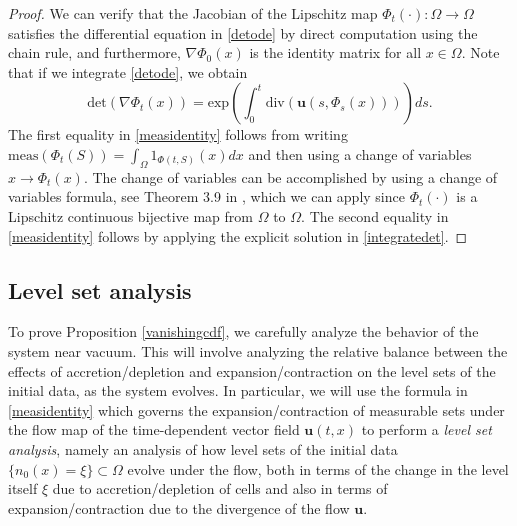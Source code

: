 \documentclass[12pt]{article}
\newcommand{\bd}{\boldsymbol}
\theoremstyle{plain}
\begin{document}
\begin{proof}
We can verify that the Jacobian of the Lipschitz map $\Phi_{t}(\cdot): \Omega \to \Omega$ satisfies the differential equation in \eqref{detode} by direct computation using the chain rule, and furthermore, $\nabla \Phi_{0}(x)$ is the identity matrix for all $x \in \Omega$. Note that if we integrate \eqref{detode}, we obtain
\begin{equation}\label{integratedet}
\text{det}(\nabla \Phi_{t}(x)) = \text{exp}\left(\int_{0}^{t} \text{div}(\bd{u}(s, \Phi_{s}(x)))\right) ds.
\end{equation}
The first equality in \eqref{measidentity} follows from writing $\displaystyle \text{meas}(\Phi_{t}(S)) = \int_{\Omega} 1_{\Phi(t, S)}(x) dx$ and then using a change of variables $x \to \Phi_{t}(x)$. The change of variables can be accomplished by using a change of variables formula, see Theorem 3.9 in \cite{EvansGariepy}, which we can apply since $\Phi_{t}(\cdot)$ is a Lipschitz continuous bijective map from $\Omega$ to $\Omega$. The second equality in \eqref{measidentity} follows by applying the explicit solution in \eqref{integratedet}. 
\end{proof}

\subsection{Level set analysis}\label{levelsetsec}

To prove Proposition \ref{vanishingcdf}, we carefully analyze the behavior of the system near vacuum. This will involve analyzing the relative balance between the effects of accretion/depletion and  expansion/contraction on the level sets of the initial data, as the system evolves. In particular, we will use the formula in \eqref{measidentity} which governs the expansion/contraction of measurable sets under the flow map of the time-dependent vector field $\bd{u}(t, x)$ to perform a \textit{level set analysis}, namely an analysis of how level sets of the initial data $\{n_{0}(x) = \xi\} \subset \Omega$ evolve under the flow, both in terms of the change in the level itself $\xi$ due to accretion/depletion of cells and also in terms of expansion/contraction due to the divergence of the flow $\bd{u}$. 
\end{document}
